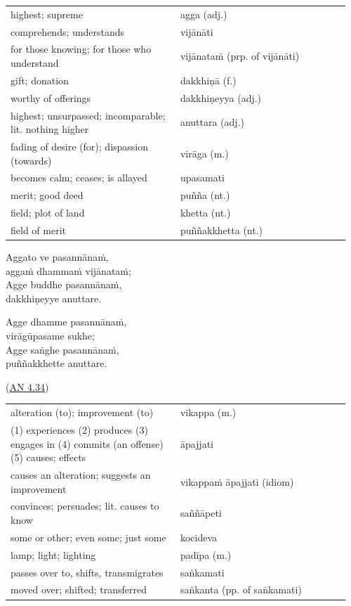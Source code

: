 \documentclass[11pt,oneside]{memoir}
\begin{document}
\begin{longtable}{L{0.48\linewidth} L{0.48\linewidth}}
highest; supreme & agga (adj.)\\[0pt]
comprehends; understands & vijānāti\\[0pt]
for those knowing; for those who understand & vijānataṁ (prp. of vijānāti)\\[0pt]
gift; donation & dakkhiṇā (f.)\\[0pt]
worthy of offerings & dakkhiṇeyya (adj.)\\[0pt]
highest; unsurpassed; incomparable; lit. nothing higher & anuttara (adj.)\\[0pt]
fading of desire (for); dispassion (towards) & virāga (m.)\\[0pt]
becomes calm; ceases; is allayed & upasamati\\[0pt]
merit; good deed & puñña (nt.)\\[0pt]
field; plot of land & khetta (nt.)\\[0pt]
field of merit & puññakkhetta (nt.)\\[0pt]
\end{longtable}

\bigskip

\begin{multicols}{2}
\setlength{\columnseprule}{0pt}

Aggato ve pasannānaṁ, \\[0pt]
aggaṁ dhammaṁ vijānataṁ; \\[0pt]
Agge buddhe pasannānaṁ, \\[0pt]
dakkhiṇeyye anuttare.

\columnbreak

Agge dhamme pasannānaṁ, \\[0pt]
virāgūpasame sukhe; \\[0pt]
Agge saṅghe pasannānaṁ, \\[0pt]
puññakkhette anuttare.

(\href{https://suttacentral.net/an4.34/pli/ms}{AN 4.34})

\end{multicols}

\bigskip

\begin{longtable}{L{0.48\linewidth} L{0.48\linewidth}}
alteration (to); improvement (to) & vikappa (m.)\\[0pt]
(1) experiences (2) produces (3) engages in (4) commits (an offense) (5) causes; effects & āpajjati\\[0pt]
causes an alteration; suggests an improvement & vikappaṁ āpajjati (idiom)\\[0pt]
convinces; persuades; lit. causes to know & saññāpeti\\[0pt]
some or other; even some; just some & kocideva\\[0pt]
lamp; light; lighting & padīpa (m.)\\[0pt]
passes over to, shifts, transmigrates & saṅkamati\\[0pt]
moved over; shifted; transferred & saṅkanta (pp. of saṅkamati)\\[0pt]
\end{longtable}
\end{document}
